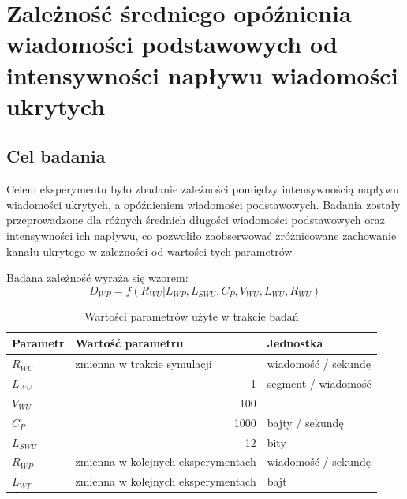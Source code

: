 \documentclass[a4paper, twoside, 12pt]{report}
\begin{document}
    \section{Zależność średniego opóźnienia wiadomości podstawowych od intensywności napływu wiadomości ukrytych} \label{OPOZNIENEPODSTAWOWYCHODUKRYTYCH}
        \subsection{Cel badania}
            Celem eksperymentu było zbadanie zależności pomiędzy intensywnością
            napływu wiadomości ukrytych, a opóźnieniem wiadomości podstawowych.
            Badania zostały przeprowadzone dla różnych średnich długości wiadomości
            podstawowych oraz intensywności ich napływu, co pozwoliło zaobserwować
            zróżnicowane zachowanie kanału ukrytego w zależności od wartości tych
            parametrów

            Badana zależność wyraża się wzorem: \\
                $$ D_{WP} = f(R_{WU} | L_{WP}, L_{SWU}, C_P, V_{WU}, L_{WU}, R_{WU}) $$
            \begin{table}[h]
                \centering
                \begin{tabular}{ | l | r | l | }
                    \hline
                    {\bfseries Parametr} & \multicolumn{1}{|l|}{{\bfseries Wartość parametru}} & {\bfseries Jednostka} \\ \hline
                    \( R_{WU} \) & \multicolumn{1}{|l|}{zmienna w trakcie symulacji} & wiadomość / sekundę \\ \hline
                    \( L_{WU} \) & 1 & segment / wiadomość \\ \hline
                    \( V_{WU} \) & 100 & \\ \hline
                    \( C_P \) & 1000 & bajty / sekundę \\ \hline
                    \( L_{SWU} \) & 12 & bity \\ \hline
                    \( R_{WP} \) & zmienna w kolejnych eksperymentach & wiadomość / sekundę \\ \hline
                    \( L_{WP} \) & zmienna w kolejnych eksperymentach & bajt \\ \hline
                \end{tabular}
                \caption{Wartości parametrów użyte w trakcie badań}
            \end{table}
\end{document}
